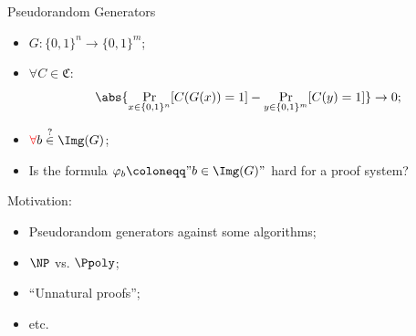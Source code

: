 \begin{frame}{Pseudorandom Generators}

    \begin{itemize}
        \item $G\colon \{0, 1\}^n \to \{0, 1\}^m$;
            \pause
        \item $\forall C \in \mathfrak{C}:$
            $$
                \abs{\Pr\limits_{x \in \{0, 1\}^n}[C(G(x)) = 1] - \Pr\limits_{y \in \{0, 1\}^m}[C(y) = 1]}
                \to 0;
            $$
            \pause
        \item $\textcolor{red}{\forall}b \stackrel{?}{\in} \Img(G)$;
            \pause
        \item Is the formula $\varphi_b \coloneqq "b \in \Img(G)"$ hard for a proof system?          
    \end{itemize}

    \pause
    \vspace{0.3cm}
    Motivation:
    \begin{itemize}
        \item Pseudorandom generators against some algorithms;
        \item $\NP$ vs. $\Ppoly$;
        \item ``Unnatural proofs'';
        \item etc. 
    \end{itemize}
\end{frame}


